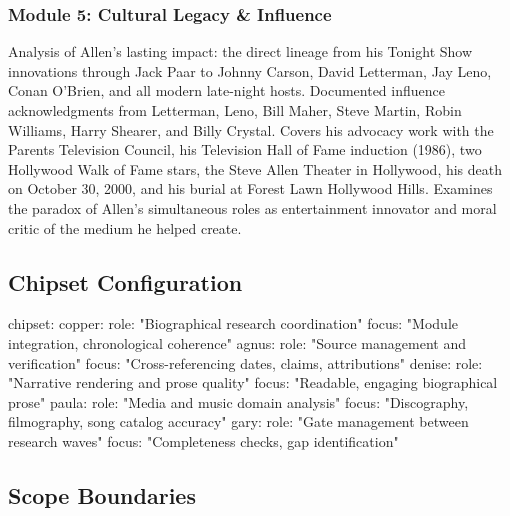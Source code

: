 \documentclass[11pt,letterpaper]{article}
\begin{document}
\subsubsection{Module 5: Cultural Legacy \& Influence}

Analysis of Allen's lasting impact: the direct lineage from his Tonight Show innovations through Jack Paar to Johnny Carson, David Letterman, Jay Leno, Conan O'Brien, and all modern late-night hosts. Documented influence acknowledgments from Letterman, Leno, Bill Maher, Steve Martin, Robin Williams, Harry Shearer, and Billy Crystal. Covers his advocacy work with the Parents Television Council, his Television Hall of Fame induction (1986), two Hollywood Walk of Fame stars, the Steve Allen Theater in Hollywood, his death on October 30, 2000, and his burial at Forest Lawn Hollywood Hills. Examines the paradox of Allen's simultaneous roles as entertainment innovator and moral critic of the medium he helped create.

\subsection{Chipset Configuration}

\begin{asciibox}
chipset:
  copper:
    role: "Biographical research coordination"
    focus: "Module integration, chronological coherence"
  agnus:
    role: "Source management and verification"
    focus: "Cross-referencing dates, claims, attributions"
  denise:
    role: "Narrative rendering and prose quality"
    focus: "Readable, engaging biographical prose"
  paula:
    role: "Media and music domain analysis"
    focus: "Discography, filmography, song catalog accuracy"
  gary:
    role: "Gate management between research waves"
    focus: "Completeness checks, gap identification"
\end{asciibox}

\subsection{Scope Boundaries}
\end{document}
